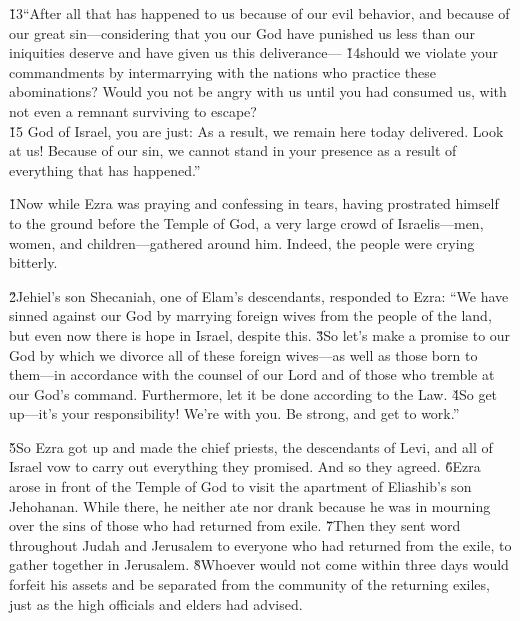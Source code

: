\begin{poetry}
\poeml \v{13}``After all that has happened to us because of our evil behavior, and because of our great sin---considering that you our God have punished us less than our iniquities deserve and have given us this deliverance--- \v{14}should we violate your commandments by intermarrying with the nations who practice these abominations? Would you not be angry with us until you had consumed us, with not even a remnant surviving to escape? \\
\poeml \v{15} God of Israel, you are just: As a result, we remain here today delivered. Look at us! Because of our sin, we cannot stand in your presence as a result of everything that has happened.''
\end{poetry}

\v{1}Now while Ezra was praying and confessing in tears, having prostrated himself to the ground before the Temple of God, a very large crowd of Israelis---men, women, and children---gathered around him. Indeed, the people were crying bitterly.

\v{2}Jehiel's son Shecaniah, one of Elam's descendants, responded to Ezra: ``We have sinned against our God by marrying foreign wives from the people of the land, but even now there is hope in Israel, despite this. \v{3}So let's make a promise to our God by which we divorce all of these foreign wives---as well as those born to them---in accordance with the counsel of our Lord and of those who tremble at our God's command. Furthermore, let it be done according to the Law. \v{4}So get up---it's your responsibility! We're with you. Be strong, and get to work.''

\v{5}So Ezra got up and made the chief priests, the descendants of Levi, and all of Israel vow to carry out everything they promised. And so they agreed. \v{6}Ezra arose in front of the Temple of God to visit the apartment of Eliashib's son Jehohanan. While there, he neither ate nor drank because he was in mourning over the sins of those who had returned from exile. \v{7}Then they sent word throughout Judah and Jerusalem to everyone who had returned from the exile, to gather together in Jerusalem. \v{8}Whoever would not come within three days would forfeit his assets and be separated from the community of the returning exiles, just as the high officials and elders had advised.

